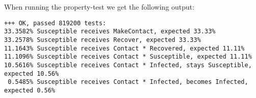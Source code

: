 %
%
%

When running the property-test we get the following output:

\begin{footnotesize}
\begin{verbatim}
+++ OK, passed 819200 tests:
33.3582% Susceptible receives MakeContact, expected 33.33%
33.2578% Susceptible receives Recover, expected 33.33%
11.1643% Susceptible receives Contact * Recovered, expected 11.11%
11.1096% Susceptible receives Contact * Susceptible, expected 11.11%
10.5616% Susceptible receives Contact * Infected, stays Susceptible, expected 10.56%
 0.5485% Susceptible receives Contact * Infected, becomes Infected, expected 0.56%
\end{verbatim}
\end{footnotesize}

